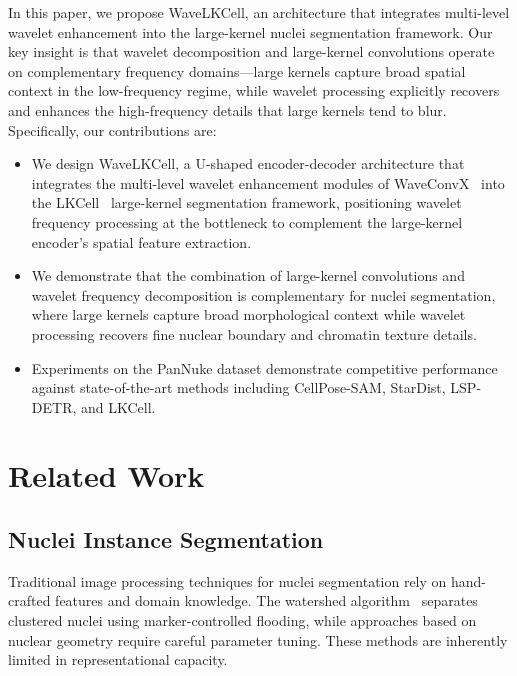 \documentclass[conference]{IEEEtran}
\begin{document}
In this paper, we propose WaveLKCell, an architecture that integrates multi-level wavelet enhancement into the large-kernel nuclei segmentation framework. Our key insight is that wavelet decomposition and large-kernel convolutions operate on complementary frequency domains---large kernels capture broad spatial context in the low-frequency regime, while wavelet processing explicitly recovers and enhances the high-frequency details that large kernels tend to blur. Specifically, our contributions are:

\begin{itemize}
    \item We design WaveLKCell, a U-shaped encoder-decoder architecture that integrates the multi-level wavelet enhancement modules of WaveConvX~\cite{waveconvx} into the LKCell~\cite{lkcell} large-kernel segmentation framework, positioning wavelet frequency processing at the bottleneck to complement the large-kernel encoder's spatial feature extraction.
    \item We demonstrate that the combination of large-kernel convolutions and wavelet frequency decomposition is complementary for nuclei segmentation, where large kernels capture broad morphological context while wavelet processing recovers fine nuclear boundary and chromatin texture details.
    \item Experiments on the PanNuke dataset demonstrate competitive performance against state-of-the-art methods including CellPose-SAM, StarDist, LSP-DETR, and LKCell.
\end{itemize}

\section{Related Work}
\label{sec:related}

\subsection{Nuclei Instance Segmentation}

Traditional image processing techniques for nuclei segmentation rely on hand-crafted features and domain knowledge. The watershed algorithm~\cite{watershed} separates clustered nuclei using marker-controlled flooding, while approaches based on nuclear geometry require careful parameter tuning. These methods are inherently limited in representational capacity.
\end{document}
